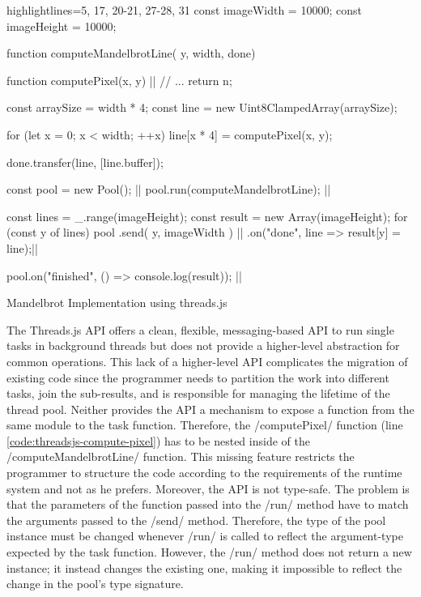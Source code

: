 \begin{listing}
	\begin{javascriptcode*}{highlightlines={5, 17, 20-21, 27-28, 31}}
const imageWidth = 10000;
const imageHeight = 10000;

function computeMandelbrotLine({ y, width}, done) {
	function computePixel(x, y) {|$\label{code:threadsjs-compute-pixel}$|
		// ...
		return n;
	}
	
	const arraySize = width * 4;
	const line = new Uint8ClampedArray(arraySize);

	for (let x = 0; x < width; ++x) {
		line[x * 4] = computePixel(x, y);
	}

	done.transfer(line, [line.buffer]);
}

const pool = new Pool(); |$\label{code:threadsjs-pool}$|
pool.run(computeMandelbrotLine); |$\label{code:threadsjs-worker}$|

const lines = _.range(imageHeight);
const result = new Array(imageHeight);
for (const y of lines) {
	pool
		.send({ y, imageWidth }) |$\label{code:threadsjs-messaging}$|
		.on("done", line => result[y] = line);|$\label{code:threadsjs-task-completion}$|
}

pool.on("finished", () => console.log(result)); |$\label{code:threadsjs-done}$|
\end{javascriptcode*}
\caption{Mandelbrot Implementation using threads.js}
\label{fig:mandelbrot-threadsjs}
\end{listing}


The Threads.js API offers a clean, flexible, messaging-based API to run single tasks in background threads but does not provide a higher-level abstraction for common operations. This lack of a higher-level API complicates the migration of existing code since the programmer needs to partition the work into different tasks, join the sub-results, and is responsible for managing the lifetime of the thread pool. Neither provides the API a mechanism to expose a function from the same module to the task function. Therefore, the \javascriptinline/computePixel/ function (line \ref{code:threadsjs-compute-pixel}) has to be nested inside of the \javascriptinline/computeMandelbrotLine/ function. This missing feature restricts the programmer to structure the code according to the requirements of the runtime system and not as he prefers. Moreover, the API is not type-safe. The problem is that the parameters of the function passed into the \javascriptinline/run/ method have to match the arguments passed to the \javascriptinline/send/ method. Therefore, the type of the pool instance must be changed whenever \javascriptinline/run/ is called to reflect the argument-type expected by the task function. However, the \javascriptinline/run/ method does not return a new instance; it instead changes the existing one, making it impossible to reflect the change in the pool's type signature.

